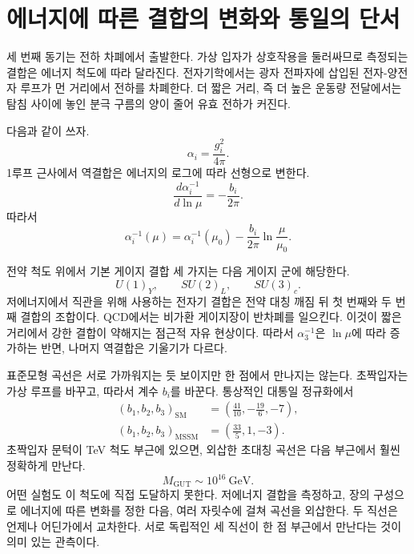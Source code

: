 \section{에너지에 따른 결합의 변화와 통일의 단서}

세 번째 동기는 전하 차폐에서 출발한다. 가상 입자가 상호작용을 둘러싸므로 측정되는 결합은 에너지 척도에 따라 달라진다. 전자기학에서는 광자 전파자에 삽입된 전자-양전자 루프가 먼 거리에서 전하를 차폐한다. 더 짧은 거리, 즉 더 높은 운동량 전달에서는 탐침 사이에 놓인 분극 구름의 양이 줄어 유효 전하가 커진다.

다음과 같이 쓰자.
\begin{equation}
\alpha_i=\frac{g_i^2}{4\pi}.
\end{equation}
1루프 근사에서 역결합은 에너지의 로그에 따라 선형으로 변한다.
\begin{equation}
\frac{d\alpha_i^{-1}}{d\ln\mu}
=-\frac{b_i}{2\pi}.
\end{equation}
따라서
\begin{equation}
\alpha_i^{-1}(\mu)
=\alpha_i^{-1}(\mu_0)
-\frac{b_i}{2\pi}\ln\frac{\mu}{\mu_0}.
\end{equation}

전약 척도 위에서 기본 게이지 결합 세 가지는 다음 게이지 군에 해당한다.
\begin{equation}
U(1)_Y,\qquad SU(2)_L,\qquad SU(3)_c.
\end{equation}
저에너지에서 직관을 위해 사용하는 전자기 결합은 전약 대칭 깨짐 뒤 첫 번째와 두 번째 결합의 조합이다. QCD에서는 비가환 게이지장이 반차폐를 일으킨다. 이것이 짧은 거리에서 강한 결합이 약해지는 점근적 자유 현상이다. 따라서 \(\alpha_3^{-1}\)은 \(\ln\mu\)에 따라 증가하는 반면, 나머지 역결합은 기울기가 다르다.

표준모형 곡선은 서로 가까워지는 듯 보이지만 한 점에서 만나지는 않는다. 초짝입자는 가상 루프를 바꾸고, 따라서 계수 \(b_i\)를 바꾼다. 통상적인 대통일 정규화에서
\begin{align}
(b_1,b_2,b_3)_{\mathrm{SM}}
&=\left(\frac{41}{10},-\frac{19}{6},-7\right),\\
(b_1,b_2,b_3)_{\mathrm{MSSM}}
&=\left(\frac{33}{5},1,-3\right).
\end{align}
초짝입자 문턱이 TeV 척도 부근에 있으면, 외삽한 초대칭 곡선은 다음 부근에서 훨씬 정확하게 만난다.
\begin{equation}
M_{\mathrm{GUT}}\sim 10^{16}\ \mathrm{GeV}.
\end{equation}
어떤 실험도 이 척도에 직접 도달하지 못한다. 저에너지 결합을 측정하고, 장의 구성으로 에너지에 따른 변화를 정한 다음, 여러 자릿수에 걸쳐 곡선을 외삽한다. 두 직선은 언제나 어딘가에서 교차한다. 서로 독립적인 세 직선이 한 점 부근에서 만난다는 것이 의미 있는 관측이다.

